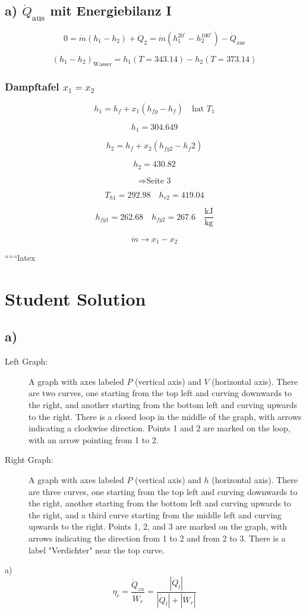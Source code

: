 \subsection*{a) $\dot{Q}_{\text{aus}}$ mit Energiebilanz I}

\[
0 = \dot{m} (h_1 - h_2) + \dot{Q}_2 = \dot{m} \left( h_1^{20^\circ} - h_2^{100^\circ} \right) - \dot{Q}_{\text{aus}}
\]

\[
(h_1 - h_2)_{\text{Wasser}} = h_1 (T = 343.14) - h_2 (T = 373.14)
\]

\subsubsection*{Dampftafel $x_1 = x_2$}

\[
h_1 = h_f + x_1 (h_{fg} - h_f) \quad \text{hat } T_1
\]

\[
h_1 = 304.649
\]

\[
h_2 = h_f + x_2 (h_{fg2} - h_f2)
\]

\[
h_2 = 430.82
\]

\[
\Rightarrow \text{Seite 3}
\]

\[
T_{h1} = 292.98 \quad h_{v2} = 419.04
\]

\[
h_{fg1} = 262.68 \quad h_{fg2} = 267.6 \quad \frac{\text{kJ}}{\text{kg}}
\]

\[
\dot{m} \rightarrow x_1 - x_2
\]

``````latex


\section*{Student Solution}



\subsection*{a)}

\begin{description}
    \item[Left Graph:] A graph with axes labeled $P$ (vertical axis) and $V$ (horizontal axis). There are two curves, one starting from the top left and curving downwards to the right, and another starting from the bottom left and curving upwards to the right. There is a closed loop in the middle of the graph, with arrows indicating a clockwise direction. Points 1 and 2 are marked on the loop, with an arrow pointing from 1 to 2.
    \item[Right Graph:] A graph with axes labeled $P$ (vertical axis) and $h$ (horizontal axis). There are three curves, one starting from the top left and curving downwards to the right, another starting from the bottom left and curving upwards to the right, and a third curve starting from the middle left and curving upwards to the right. Points 1, 2, and 3 are marked on the graph, with arrows indicating the direction from 1 to 2 and from 2 to 3. There is a label "Verdichter" near the top curve.
\end{description}

a) 
\[
\eta_{c} = \frac{\dot{Q}_{zu}}{\dot{W}_{r}} = \frac{\left| \dot{Q}_{l} \right|}{\left| \dot{Q}_{l} \right| + \left| \dot{W}_{r} \right|}
\]